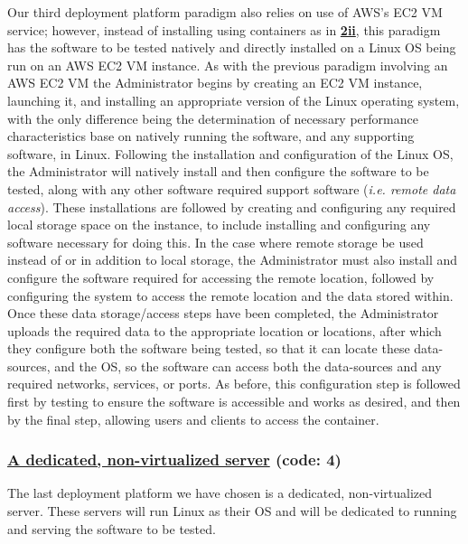 Our third deployment platform paradigm also relies on use of AWS's EC2 VM service; however, instead of installing using containers as in \textbf{\underline{2ii}}, this paradigm has the software to be tested natively and directly installed on a Linux OS being run on an AWS EC2 VM instance.  As with the previous paradigm involving an AWS EC2 VM the Administrator begins by creating an EC2 VM instance, launching it, and installing an appropriate version of the Linux operating system, with the only difference being the determination of necessary performance characteristics base on natively running the software, and any supporting software, in Linux.  Following the installation and configuration of the Linux OS, the Administrator will natively install and then configure the software to be tested, along with any other software required support software (\emph{i.e. remote data access}).  These installations are followed by creating and configuring any required local storage space on the instance, to include installing and configuring any software necessary for doing this.  In the case where remote storage be used instead of or in addition to local storage, the Administrator must also install and configure the software required for accessing the remote location, followed by configuring the system to access the remote location and the data stored within.  Once these data storage/access steps have been completed, the Administrator uploads the required data to the appropriate location or locations, after which they configure both the software being tested, so that it can locate these data-sources, and the OS, so the software can access both the data-sources and any required networks, services, or ports.  As before, this configuration step is followed first by testing to ensure the software is accessible and works as desired, and then by the final step, allowing users and clients to access the container.


\subsubsection{\underline{A dedicated, non-virtualized server} (code: \textbf{4})}

The last deployment platform we have chosen is a dedicated, non-virtualized server.  These servers will run Linux as their OS and will be dedicated to running and serving the software to be tested.










